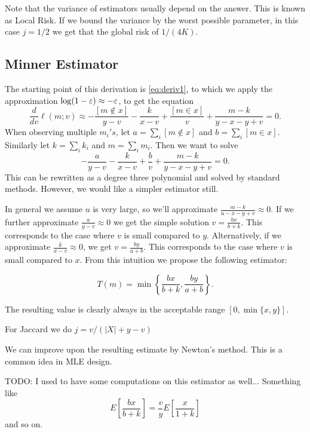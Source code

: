 Note that the variance of estimators usually depend on the answer.
This is known as Local Risk.
If we bound the variance by the worst possible parameter, in this case $j=1/2$ we get that the global risk of $1/(4K)$.

\subsection{Minner Estimator}

The starting point of this derivation is \cref{eq:deriv1},
to which we apply the approximation $\log(1-\varepsilon) \approx -\varepsilon$,
to get the equation
\[
   \frac{d}{dv}\ell(m;v) \approx
   -\frac{[m\not\in x]}{y-v} 
   -\frac{k}{x-v} 
   +\frac{[m\in x]}{v} 
   +\frac{m-k}{y-x-y+v} 
   = 0.
\]
When observing multiple $m_i's$, let $a=\sum_i [m\not\in x]$ and $b=\sum_i [m\in x]$.
Similarly let $k=\sum_i k_i$ and $m=\sum_i m_i$.
Then we want to solve
\[
   -\frac{a}{y-v} 
   -\frac{k}{x-v} 
   +\frac{b}{v} 
   +\frac{m-k}{y-x-y+v} 
   = 0.
\]
This can be rewritten as a degree three polynomial and solved by standard methods.
However, we would like a simpler estimator still.

In general we assume $u$ is very large, so we'll approximate $\frac{m-k}{u-x-y+v}\approx 0$.
If we further approximate $\frac{a}{y-v}\approx 0$ we get the simple solution $v=\frac{bx}{b+k}$.
This corresponds to the case where $v$ is small compared to $y$.
Alternatively, if we approximate $\frac{k}{x-v}\approx 0$, we get $v=\frac{b y}{a+b}$.
This corresponds to the case where $v$ is small compared to $x$.
From this intuition we propose the following estimator:
\begin{definition}
\[
   T(m) = \min\left\{\frac{bx}{b+k}, \frac{b y}{a+b}\right\}.
   \label{eq:minner}
\]
\end{definition}
The resulting value is clearly always in the acceptable range $[0,\min\{x,y\}]$.

For Jaccard we do $j = v/(|X| + y - v)$


We can improve upon the resulting estimate by Newton's method.
This is a common idea in MLE design. %

TODO: I used to have some computations on this estimator as well...
Something like
\[
   E[\frac{bx}{b+k}] = \frac{v}{y} E[\frac{x}{1+k}]
\]
and so on.

